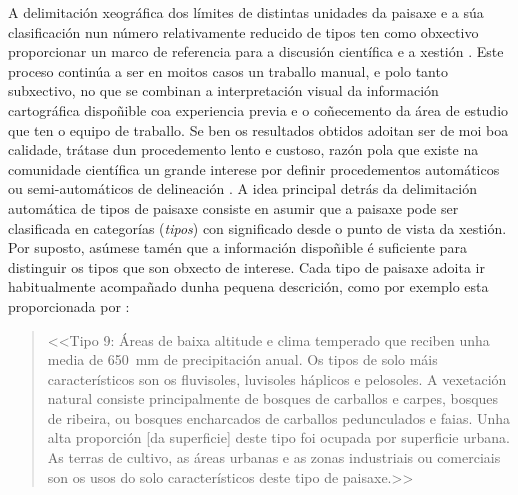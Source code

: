 \documentclass[11pt,a4paper]{article}
\begin{document}
A delimitación xeográfica dos límites de distintas unidades da paisaxe e a súa clasificación nun número relativamente reducido de tipos ten como obxectivo proporcionar un marco de referencia para a discusión científica e a xestión \citep{Brown2012317}. Este proceso continúa a ser en moitos casos un traballo manual, e polo tanto subxectivo, no que se combinan a interpretación visual da información cartográfica dispoñible coa experiencia previa e o coñecemento da área de estudio que ten o equipo de traballo. Se ben os resultados obtidos adoitan ser de moi boa calidade, trátase dun procedemento lento e custoso, razón pola que existe na comunidade científica un grande interese por definir procedementos automáticos ou semi-automáticos de delineación \citep{Mucher201087,Jasiewicz2014104}. A idea principal detrás da delimitación automática de tipos de paisaxe consiste en asumir que a paisaxe pode ser clasificada en categorías (\emph{tipos}) con significado desde o punto de vista da xestión. Por suposto, asúmese tamén que a información dispoñible é suficiente para distinguir os tipos que son obxecto de interese. Cada tipo de paisaxe adoita ir habitualmente acompañado dunha pequena descrición, como por exemplo esta proporcionada por \citet{Chuman2010200}:
\begin{quote}
<<Tipo 9: Áreas de baixa altitude e clima temperado que reciben unha media de 650~mm de precipitación anual. Os tipos de solo máis característicos son os fluvisoles, luvisoles háplicos e pelosoles. A vexetación natural consiste principalmente de bosques de carballos e carpes, bosques de ribeira, ou bosques encharcados de carballos pedunculados e faias. Unha alta proporción [da superficie] deste tipo foi ocupada por superficie urbana. As terras de cultivo, as áreas urbanas e as zonas industriais ou comerciais son os usos do solo característicos deste tipo de paisaxe.>>
\end{quote}

\end{document}
